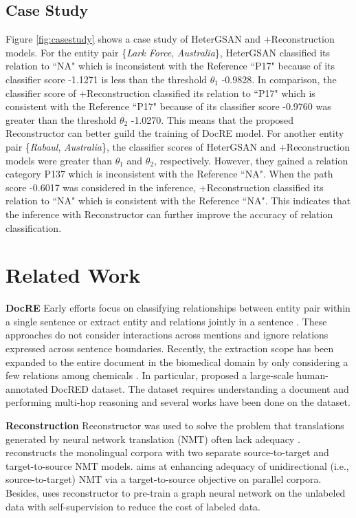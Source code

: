 \documentclass[letterpaper]{article} \usepackage{aaai21}  \usepackage{times}  \usepackage{helvet} \usepackage{courier}  \usepackage[hyphens]{url}  \usepackage{graphicx} \urlstyle{rm} \def\UrlFont{\rm}  \usepackage{natbib}  \usepackage{caption} \frenchspacing  \setlength{\pdfpagewidth}{8.5in}  \setlength{\pdfpageheight}{11in}  \usepackage{amsmath}
\begin{document}
\subsection{Case Study}
Figure \ref{fig:casestudy} shows a case study of HeterGSAN and +Reconstruction models. 
For the entity pair \{\textit{Lark Force}, \textit{Australia}\}, HeterGSAN classified its relation to ``NA" which is inconsistent with the Reference ``P17" because of its classifier score -1.1271 is less than the threshold $\theta_1$ -0.9828.
In comparison, the classifier score of +Reconstruction classified its relation to ``P17" which is consistent with the Reference ``P17" because of its classifier score -0.9760 was greater than the threshold $\theta_2$ -1.0270.
This means that the proposed Reconstructor can better guild the training of DocRE model.
For another entity pair \{\textit{Rabaul}, \textit{Australia}\}, the classifier scores of HeterGSAN and +Reconstruction models were greater than $\theta_1$ and $\theta_2$, respectively.
However, they gained a relation category P137 which is inconsistent with the Reference ``NA".
When the path score -0.6017 was considered in the inference, +Reconstruction classified its relation to ``NA" which is consistent with the Reference ``NA".
This indicates that the inference with Reconstructor can further improve the accuracy of relation classification.

\section{Related Work}
\textbf{DocRE} 
Early efforts focus on classifying relationships between entity pair within a single sentence or extract entity and relations jointly in a sentence \cite{zeng-etal-2014-relation,wang-etal-2016-relation,wei2019novel,Song_2019}. 
These approaches do not consider interactions across mentions and ignore relations expressed across sentence boundaries. 
Recently, the extraction scope has been expanded to the entire document in the biomedical domain by only considering a few relations among chemicals \cite{DBLP:journals/tacl/PengPQTY17,quirk-poon-2017-distant,DBLP:journals/corr/abs-1810-05102,zhang-etal-2018-graph,Christopoulou2019ConnectingTD}. 
In particular, \citet{yao-etal-2019-docred} proposed a large-scale human-annotated DocRED dataset.
The dataset requires understanding a document and performing multi-hop reasoning and several works \cite{Wang2019FinetuneBF,Nan2020ReasoningWL} have been done on the dataset.

\textbf{Reconstruction}
Reconstructor was used to solve the problem that translations generated by neural network translation (NMT) often lack adequacy \cite{nmt-rec,nmt-chen}. \cite{nmt-chen} reconstructs the monolingual corpora with two separate source-to-target and target-to-source NMT models. \cite{nmt-rec} aims at enhancing adequacy of unidirectional (i.e., source-to-target) NMT via a target-to-source objective on parallel corpora.
Besides, \cite{gpt-gnn} uses reconstructor to pre-train a graph neural network on the unlabeled data with self-supervision to reduce the cost of labeled data.
\end{document}
